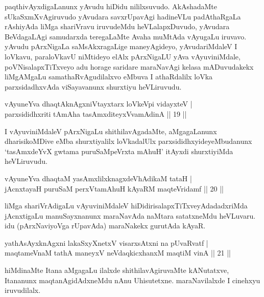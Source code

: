 \begin{artha}%
paqthivAyxdigaLanunx yAvudu hiDidu nililxsuvudo. AkAshadaMte sUkaSxmXvAgiruvudo yAvudara savxrUpavAgi hadineVLu padAthaRgaLa rAshiyAda liMga shariVravu iruvudeMdu heVLalapxDuvudo, yAvudara BeVdagaLAgi samudarxda teregaLaMte  Avaha muMtAda vAyugaLu iruvavo. yAvudu pArxNigaLa saMsAkxragaLige maneyAgideyo, yAvudariMdaleV I loVkavu, paraloVkavU niMtideyo elAlx pArxNigaLU yAva vAyuviniMdale, poVNisalapxTiTxveyo adu horage saridare maraNavAgi kelasa mADuvudakekx liMgAMgaLu samathaRvAgudilalxvo eMbuva I athaRdalilx loVka parxsidadhxvAda viSayavanunx shurxtiyu heVLiruvudu. 
\end{artha}

\begin{shl}
vAyuneYva dhaqtAknAgxniVtayxtarx loVkeV\s pi vidayxteV |\\
parxsididhxriti tAmAha tasAmxditeyxVvamAdinA \hfill || 19 ||
\end{shl}

\begin{artha}%
I vAyuviniMdaleV pArxNigaLu shithilavAgadaMte, aMgagaLanunx dharisikoMDive eMba shurxtiyalilx loVkadalUlx parxsididhxyideyeMbudanunx `tasAmxdeYvX gwtama puruSaMpeVrxta mAhuH' itAyxdi shurxtiyiMda heVLiruvudu.
\end{artha}


\begin{shl}
vAyuneYva dhaqtaM yasAmxlilxknagxdeVhAdikaM tataH |\\
jAcnxtayaH puruSaM perxVtamAhuH kAyaRM maqteVridamf \hfill || 20 ||
\end{shl}

\begin{artha}
liMga shariVrAdigaLu vAyuviniMdaleV hiDidirisalapxTiTxveyAdadadxriMda jAcnxtigaLu manuSayxnanunx maraNavAda naMtara satatxneMdu heVLuvaru. idu (pArxNaviyoVga rUpavAda) maraNakekx gurutAda kAyaR.
\end{artha}


\begin{shl}
yathA\s sAyxknAgxni lakaSxyXnetxV visarxsAtxni na pUvaRvatf |\\
maqtameVnaM tathA maneyxV neVdaqkicxhanxM maqtiM vinA \hfill || 21 ||
\end{shl}

\begin{artha}
hiMdinaMte Itana aMgagaLu ilalxde shithilavAgiruvaMte kANutatxve, Itananunx maqtanAgidAdxneMdu nAnu Uhisutetxne. maraNavilalxde I cinehxyu iruvudilalx.
\end{artha}

